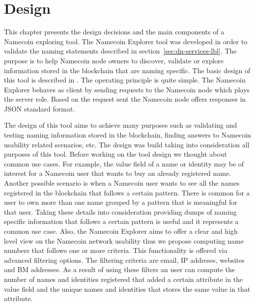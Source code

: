 \chapter{Design}
\label{chapter:4}

This chapter presents the design decisions and the main components of a Namecoin exploring tool. The Namecoin Explorer tool was developed in order to validate the naming statements described in section~\ref{sec:dn-services-lbl}.
The purpose is to help Namecoin node owners to discover, validate or explore information stored in the blockchain that are naming specific. The basic design of this tool is described in . The operating principle is quite simple. The Namecoin Explorer behaves as client by sending requests to the Namecoin node which plays the server role. Based on the request sent the Namecoin node offers responses in JSON standard format.


The design of this tool aims to achieve many purposes such as validating and testing naming information stored in the blockchain, finding answers to Namecoin usability related scenarios, etc. The design was build taking into consideration all purposes of this tool.
Before working on the tool design we thought about common use cases. For example, the value field of a name or identity may be of interest for a Namecoin user that wants to buy an already registered name. Another possible scenario is when a Namecoin user wants to see all the names registered in the blockchain that follows a certain pattern. There is common for a user to own more than one name grouped by a pattern that is meaningful for that user. Taking these details into consideration providing dumps of naming specific information that follows a certain pattern is useful and it represents a common use case.
Also, the Namecoin Explorer aims to offer a clear and high level view on the Namecoin network usability thus we propose computing name numbers that follows one or more criteria. This functionality is offered via advanced filtering options. The filtering criteria are email, IP addreses, websites and BM addresses.
As a result of using these filters an user can compute the number of names and identities registered that added a certain attribute in the value field and the unique names and identities that stores the same value in that attribute.


